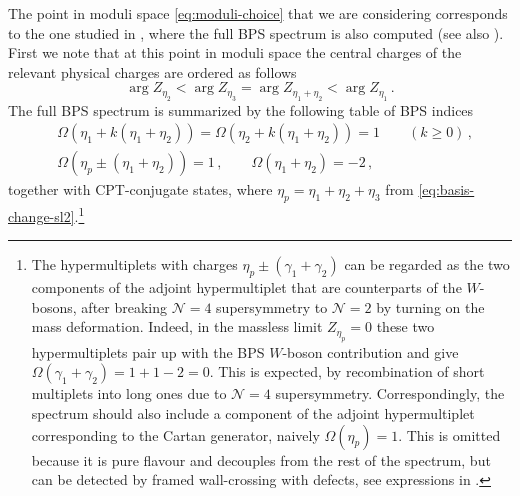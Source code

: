 \documentclass{article}
\numberwithin{equation}{section}
\def\be{\begin{equation}}
\def\ee{\end{equation}}
\def\CN{{\mathcal{N}}}
\begin{document}
The point in moduli space \eqref{eq:moduli-choice} that we are considering corresponds to the one studied in \cite[Section 1.5 \& Section 5]{Longhi:2015ivt}, where the full BPS spectrum is also computed (see also \cite{Longhi:2016wtv, ruter2021novel}).
First we note that at this point in moduli space the central charges of the relevant physical charges are ordered as follows 
\be
	\arg Z_{\eta_2} < \arg Z_{\eta_3}=\arg Z_{\eta_1+\eta_2} < \arg Z_{\eta_1}\,.
\ee
The full BPS spectrum is summarized by the following table of BPS indices
\be\label{eq:BPS-spectrum}
\begin{split}
	&\Omega(\eta_1 + k(\eta_1+\eta_2)) = \Omega(\eta_2 + k(\eta_1+\eta_2)) = 1
	\qquad(k\geq 0)\,,
	\\
	& \Omega(\eta_p \pm (\eta_1+\eta_2) ) =  1 \,,
	\qquad
	\Omega(\eta_1+\eta_2) = -2\,,
\end{split}
\ee
together with CPT-conjugate states, where $\eta_p = \eta_1+\eta_2+\eta_3$ from \eqref{eq:basis-change-sl2}.\footnote{The hypermultiplets with charges $\eta_p\pm(\gamma_1+\gamma_2)$ can be regarded as the two components of the adjoint hypermultiplet that are counterparts of the $W$-bosons, after breaking $\CN=4$ supersymmetry to $\CN=2$ by turning on the mass deformation. Indeed, in the massless limit $Z_{\eta_p}=0$ these two hypermultiplets pair up with the BPS $W$-boson contribution and give $\Omega(\gamma_1+\gamma_2)=1+1-2=0$. This is expected, by recombination of short multiplets into long ones due to $\CN=4$ supersymmetry. Correspondingly, the spectrum should also include a component of the adjoint hypermultiplet corresponding to the Cartan generator, naively $\Omega(\eta_p)=1$. This is omitted because it is pure flavour and decouples from the rest of the spectrum, but can be detected by framed wall-crossing with defects, see expressions in \cite[Section 4.5]{Longhi:2016wtv}.}
\end{document}
